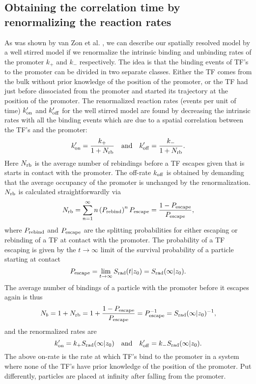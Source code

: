 \subsection{Obtaining the correlation time by renormalizing the reaction rates}
As was shown by van Zon et al. \cite{VanZon2006}, we can describe our spatially resolved model by a well stirred model if we renormalize the intrinsic binding and unbinding rates of the promoter $k_+$ and $k_-$ respectively. The idea is that the binding events of TF's to the promoter can be divided in two separate classes. Either the TF comes from the bulk without prior knowledge of the position of the promoter, or the TF had just before dissociated from the promoter and started its trajectory at the position of the promoter. The renormalized reaction rates (events per unit of time) $k'_{\rm on}$ and $k'_{\rm off}$ for the well stirred model are found by decreasing the intrinsic rates with all the binding events which are due to a spatial correlation between the TF's and the promoter:
\begin{equation}
 k'_{\rm on} = \frac{k_+}{1 + N_{\rm rb}} \quad \text{and} \quad k'_{\rm off} = \frac{k_-}{1 + N_{\rm rb}}.
\end{equation}
Here $N_{\rm rb}$ is the average number of rebindings before a TF escapes given that is starts in contact with the promoter. The off-rate $k_{\rm off}$ is obtained by demanding that the average occupancy of the promoter is unchanged by the renormalization. $N_{\rm rb}$ is calculated straightforwardly via
\begin{equation}
 N_{\rm rb} = \sum_{n=1}^{\infty} n \left( P_{\rm rebind} \right)^n P_{\rm escape} = \frac{1-P_{\rm escape}}{P_{\rm escape}},
\end{equation}
where $P_{\rm rebind}$ and $P_{\rm escape}$ are the splitting probabilities for either escaping or rebinding of a TF at contact with the promoter. The probability of a TF escaping is given by the $t \to \infty$ limit of the survival probability of a particle starting at contact 
\begin{equation}
 P_{\rm escape} = \lim_{t \to \infty} S_{\rm rad}(t|z_0) = S_{\rm rad}(\infty|z_0).
\end{equation}
The average number of bindings of a particle with the promoter before it escapes again is thus
\begin{equation}
 N_b = 1 + N_{\rm rb} = 1 + \frac{1 - P_{\rm escape}}{P_{\rm escape}} = P_{\rm escape}^{-1} = S_{\rm rad}(\infty|z_0)^{-1},
\end{equation}
and the renormalized rates are
\begin{equation}
 k'_{\rm on} = k_+ S_{\rm rad}(\infty|z_0) \quad \text{and} \quad  k'_{\rm off} = k_- S_{\rm rad}(\infty|z_0).
 \elabel{RenRates}
\end{equation}
The above on-rate is the rate at which TF's bind to the promoter in a system where none of the TF's have prior knowledge of the position of the promoter. Put differently, particles are placed at infinity after falling from the promoter. 


